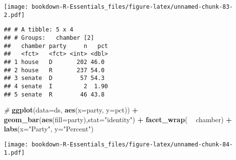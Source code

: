 \documentclass[]{book}
\newenvironment{Shaded}{\begin{snugshade}}{\end{snugshade}}
\newcommand{\KeywordTok}[1]{\textcolor[rgb]{0.13,0.29,0.53}{\textbf{#1}}}
\newcommand{\DataTypeTok}[1]{\textcolor[rgb]{0.13,0.29,0.53}{#1}}
\newcommand{\DecValTok}[1]{\textcolor[rgb]{0.00,0.00,0.81}{#1}}
\newcommand{\StringTok}[1]{\textcolor[rgb]{0.31,0.60,0.02}{#1}}
\newcommand{\CommentTok}[1]{\textcolor[rgb]{0.56,0.35,0.01}{\textit{#1}}}
\newcommand{\OperatorTok}[1]{\textcolor[rgb]{0.81,0.36,0.00}{\textbf{#1}}}
\newcommand{\NormalTok}[1]{#1}
\begin{document}
\texttt{[image: bookdown-R-Essentials\_files/figure-latex/unnamed-chunk-83-2.pdf]}

\begin{Shaded}
\end{Shaded}

\begin{verbatim}
## # A tibble: 5 x 4
## # Groups:   chamber [2]
##   chamber party     n   pct
##   <fct>   <fct> <int> <dbl>
## 1 house   D       202 46.0 
## 2 house   R       237 54.0 
## 3 senate  D        57 54.3 
## 4 senate  I         2  1.90
## 5 senate  R        46 43.8
\end{verbatim}

\begin{Shaded}
\begin{Highlighting}[]
\CommentTok{#}
\KeywordTok{ggplot}\NormalTok{(}\DataTypeTok{data=}\NormalTok{ds, }\KeywordTok{aes}\NormalTok{(}\DataTypeTok{x=}\NormalTok{party, }\DataTypeTok{y=}\NormalTok{pct)) }\OperatorTok{+}\StringTok{ }\KeywordTok{geom_bar}\NormalTok{(}\KeywordTok{aes}\NormalTok{(}\DataTypeTok{fill=}\NormalTok{party),}\DataTypeTok{stat=}\StringTok{"identity"}\NormalTok{) }\OperatorTok{+}
\StringTok{  }\KeywordTok{facet_wrap}\NormalTok{( }\OperatorTok{~}\StringTok{ }\NormalTok{chamber) }\OperatorTok{+}
\StringTok{  }\KeywordTok{labs}\NormalTok{(}\DataTypeTok{x=}\StringTok{"Party"}\NormalTok{, }\DataTypeTok{y=}\StringTok{"Percent"}\NormalTok{)}
\end{Highlighting}
\end{Shaded}

\texttt{[image: bookdown-R-Essentials\_files/figure-latex/unnamed-chunk-84-1.pdf]}
\end{document}
